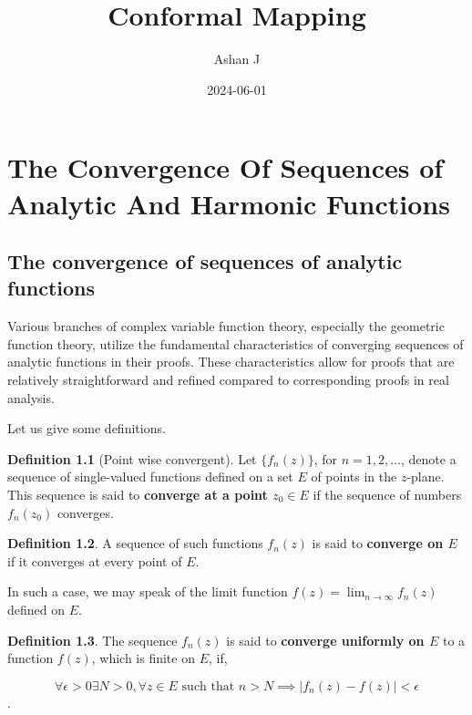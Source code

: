 \documentclass[
]{book}
\title{Conformal Mapping}
\author{Ashan J}
\date{2024-06-01}
\theoremstyle{definition}
\newtheorem{definition}{Definition}[chapter]
\theoremstyle{definition}
\theoremstyle{definition}
\theoremstyle{definition}
\theoremstyle{remark}
\begin{document}
\maketitle

{
\setcounter{tocdepth}{1}
\tableofcontents
}
\chapter{The Convergence Of Sequences of Analytic And Harmonic Functions}\label{the-convergence-of-sequences-of-analytic-and-harmonic-functions}

\section{The convergence of sequences of analytic functions}\label{the-convergence-of-sequences-of-analytic-functions}

Various branches of complex variable function theory, especially the geometric function theory, utilize the fundamental characteristics of converging sequences of analytic functions in their proofs. These characteristics allow for proofs that are relatively straightforward and refined compared to corresponding proofs in real analysis.

Let us give some definitions.

\begin{definition}[Point wise convergent]
\protect\hypertarget{def:unnamed-chunk-1}{}\label{def:unnamed-chunk-1}Let \(\{f_n (z)\}\), for \(n = 1, 2, \ldots\), denote a sequence of single-valued functions defined on a set \(E\) of points in the \(z\)-plane.
This sequence is said to \textbf{converge at a point \(z_0 \in E\)} if the sequence of numbers \(f_n (z_0)\) converges.
\end{definition}

\begin{definition}
\protect\hypertarget{def:unnamed-chunk-2}{}\label{def:unnamed-chunk-2}A sequence of such functions \(f_n (z)\) is said to \textbf{converge on \(E\)} if it converges at every point of \(E\).

In such a case, we may speak of the limit function \(f(z) = \lim_{n\to\infty} f_n (z)\) defined on \(E\).
\end{definition}

\begin{definition}
\protect\hypertarget{def:unnamed-chunk-3}{}\label{def:unnamed-chunk-3}The sequence \({f_n (z)}\) is said to \textbf{converge uniformly on \(E\)} to a function \(f(z)\), which is finite on \(E\), if,

\[\forall \epsilon > 0 \exists N > 0 , \forall z \in E \text{ such that } n > N \implies |f_n (z) - f(z)| < \epsilon \].
\end{definition}
\end{document}
